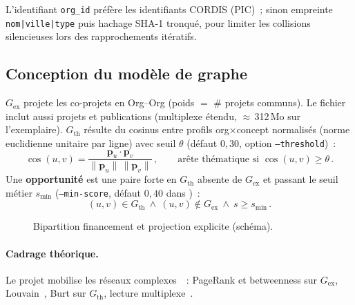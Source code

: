 \documentclass[12pt,a4paper,oneside]{article}
\begin{document}
L'identifiant \texttt{org\_id} préfère les identifiants CORDIS (PIC)~; sinon empreinte \texttt{nom|ville|type} puis hachage SHA-1 tronqué, pour limiter les collisions silencieuses lors des rapprochements itératifs.

\subsection{Conception du modèle de graphe}
$G_{\mathrm{ex}}$ projete les co-projets en Org--Org (poids $=$ \# projets communs). Le fichier  inclut aussi projets et publications (multiplexe étendu, $\approx$\,312\,Mo sur l'exemplaire). $G_{\mathrm{th}}$ résulte du cosinus entre profils org$\times$concept normalisés (norme euclidienne unitaire par ligne) avec seuil $\theta$ (défaut $0{,}30$, option \texttt{--threshold})~:
\begin{equation}
\label{eq:cosinus}
\cos(u,v)=\frac{\mathbf{p}_u\cdot\mathbf{p}_v}{\|\mathbf{p}_u\|\,\|\mathbf{p}_v\|}\,,\qquad
\text{arête thématique si }\cos(u,v)\geq\theta\,.
\end{equation}
Une \textbf{opportunité} est une paire forte en $G_{\mathrm{th}}$ absente de $G_{\mathrm{ex}}$ et passant le seuil métier $s_{\min}$ (\texttt{--min-score}, défaut $0{,}40$ dans )~:
\begin{equation}
\label{eq:opportunite}
(u,v)\in G_{\mathrm{th}}\ \land\ (u,v)\notin G_{\mathrm{ex}}\ \land\ s\geq s_{\min}\,.
\end{equation}

\begin{figure}[htbp]
\centering
{}
\caption{Bipartition financement et projection explicite (schéma).}
\label{fig:bipartite}
\end{figure}


\paragraph{Cadrage théorique.}
Le projet mobilise les réseaux complexes~\cite{newman2010}~: PageRank et betweenness sur $G_{\mathrm{ex}}$, Louvain~\cite{blondel2008}, Burt sur $G_{\mathrm{th}}$, lecture multiplexe~\cite{fortunato2010}.
\end{document}
